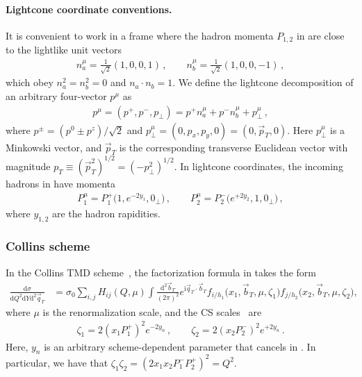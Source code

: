 \documentclass[11pt,a4paper]{article}
\newcommand{\df}{\mathrm{d}}
\newcommand{\img}{\mathrm{i}}
\newcommand{\bt}{\vec b_T}
\newcommand{\pt}{\vec p_T}
\newcommand{\qt}{\vec q_T}
\newcommand{\na}{n_a}
\newcommand{\nb}{n_b}
\begin{document}
\paragraph{Lightcone coordinate conventions.} 
It is convenient to work in a frame where the hadron momenta $P_{1,2}$ in  are close to the lightlike unit vectors
\begin{align} \label{eq:na_nb}
	\na^\mu = \frac{1}{\sqrt2} (1, 0, 0, 1) \,,\qquad \nb^\mu = \frac{1}{\sqrt2} (1, 0, 0, -1)
	\,,\end{align}
which obey $\na^2 = \nb^2 = 0$ and $\na \cdot \nb = 1$.
We define the lightcone decomposition of an arbitrary four-vector $p^\mu$ as
\begin{align}
	p^\mu = (p^+, p^-, p_\perp) = p^+ \na^\mu + p^- \nb^\mu + p_\perp^\mu
	\,,\end{align}
where $p^\pm = (p^0 \pm p^z) / \sqrt2$
and $p_\perp^\mu = (0, p_x, p_y, 0) = (0, \pt, 0)$.
Here $p_\perp^\mu$ is a Minkowski vector, and $\pt$ is the corresponding transverse Euclidean vector with magnitude $p_T \equiv (\pt^2)^{1/2} =  (-p_\perp^2)^{1/2}$.
In lightcone coordinates, the incoming hadrons in  have momenta
\begin{align}
	P_1^\mu = P_1^+ \bigl(1, e^{-2 y_1}, 0_\perp \bigr)
	\,,\qquad
	P_2^\mu = P_2^- \bigl(e^{+2 y_2}, 1, 0_\perp \bigr)
	\,,\end{align}
where $y_{1,2}$ are the hadron rapidities.


\subsubsection{Collins scheme}
\label{sec:collins-scheme}

In the Collins TMD scheme~\cite{Collins:1350496}, the factorization formula in  takes the form
\begin{align} \label{eq:fact_thm_Collins}
 \frac{\df\sigma}{\df Q^2 \df Y \df^2\qt} &
 = \sigma_0 \sum_{i,j} H_{ij}(Q, \mu)
   \!\int\!\!\frac{\df^2\bt}{(2\pi)^2} e^{\img \qt \cdot \bt}
   f_{i/h_1}\bigl(x_1, \bt, \mu,\zeta_1\bigr) f_{j/h_2}\bigl(x_2, \bt, \mu,\zeta_2 \bigr)
,\end{align}
where $\mu$ is the renormalization scale,
and the CS scales~\cite{Collins:1981va,Collins:1981uk} are
\begin{align} \label{eq:CS_scale_Collins}
 \zeta_1 = 2 (x_1 P_1^+)^2 e^{-2 y_n}
 \,,\qquad
 \zeta_2 = 2 (x_2 P_2^-)^2 e^{+2 y_n}
\,.\end{align}
Here, $y_n$ is an arbitrary scheme-dependent parameter that cancels in .
In particular, we have that $\zeta_1 \zeta_2 = (2 x_1 x_2 P_1^- P_2^+)^2 = Q^2$.
\end{document}
